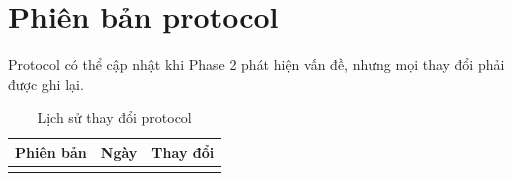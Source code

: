 \section{Phiên bản protocol}

Protocol có thể cập nhật khi Phase 2 phát hiện vấn đề, nhưng mọi thay đổi phải được ghi lại.

\begin{table}[H]
  \centering
  \caption{Lịch sử thay đổi protocol}
  \begin{tabularx}{\linewidth}{l l X}
    \toprule
    \textbf{Phiên bản} & \textbf{Ngày} & \textbf{Thay đổi} \\
    \midrule
     &  &  \\
    \bottomrule
  \end{tabularx}
\end{table}
